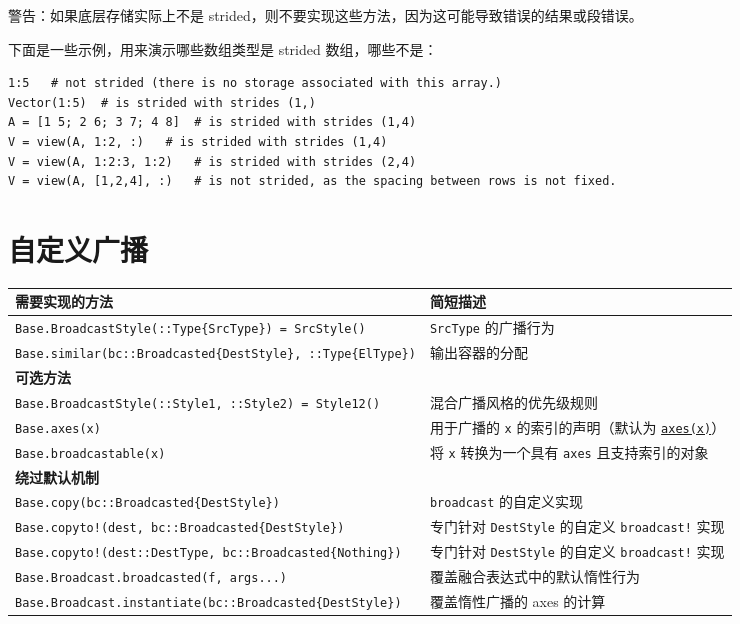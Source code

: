 警告：如果底层存储实际上不是 strided，则不要实现这些方法，因为这可能导致错误的结果或段错误。



下面是一些示例，用来演示哪些数组类型是 strided 数组，哪些不是：




\begin{verbatim}
1:5   # not strided (there is no storage associated with this array.)
Vector(1:5)  # is strided with strides (1,)
A = [1 5; 2 6; 3 7; 4 8]  # is strided with strides (1,4)
V = view(A, 1:2, :)   # is strided with strides (1,4)
V = view(A, 1:2:3, 1:2)   # is strided with strides (2,4)
V = view(A, [1,2,4], :)   # is not strided, as the spacing between rows is not fixed.
\end{verbatim}



\hypertarget{8927705294232715192}{}


\section{自定义广播}




\begin{table}[h]

\begin{tabulary}{\linewidth}{|L|L|}
\hline
需要实现的方法 & 简短描述 \\
\hline
\texttt{Base.BroadcastStyle(::Type\{SrcType\}) = SrcStyle()} & \texttt{SrcType} 的广播行为 \\
\hline
\texttt{Base.similar(bc::Broadcasted\{DestStyle\}, ::Type\{ElType\})} & 输出容器的分配 \\
\hline
\textbf{可选方法} &  \\
\hline
\texttt{Base.BroadcastStyle(::Style1, ::Style2) = Style12()} & 混合广播风格的优先级规则 \\
\hline
\texttt{Base.axes(x)} & 用于广播的 \texttt{x} 的索引的声明（默认为 \hyperlink{7074821531920287868}{\texttt{axes(x)}}） \\
\hline
\texttt{Base.broadcastable(x)} & 将 \texttt{x} 转换为一个具有 \texttt{axes} 且支持索引的对象 \\
\hline
\textbf{绕过默认机制} &  \\
\hline
\texttt{Base.copy(bc::Broadcasted\{DestStyle\})} & \texttt{broadcast} 的自定义实现 \\
\hline
\texttt{Base.copyto!(dest, bc::Broadcasted\{DestStyle\})} & 专门针对 \texttt{DestStyle} 的自定义 \texttt{broadcast!} 实现 \\
\hline
\texttt{Base.copyto!(dest::DestType, bc::Broadcasted\{Nothing\})} & 专门针对 \texttt{DestStyle} 的自定义 \texttt{broadcast!} 实现 \\
\hline
\texttt{Base.Broadcast.broadcasted(f, args...)} & 覆盖融合表达式中的默认惰性行为 \\
\hline
\texttt{Base.Broadcast.instantiate(bc::Broadcasted\{DestStyle\})} & 覆盖惰性广播的 axes 的计算 \\
\hline
\end{tabulary}

\end{table}



